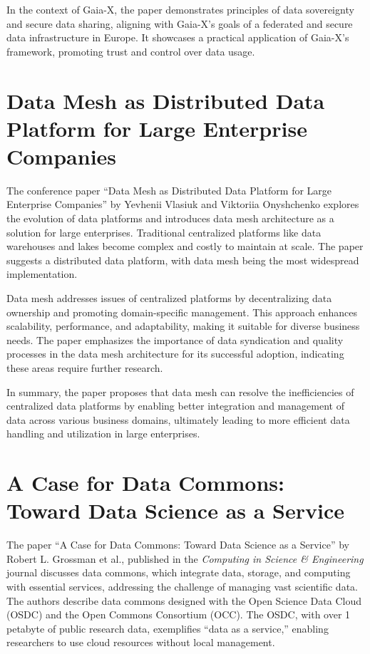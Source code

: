 In the context of Gaia-X, the paper demonstrates principles of data sovereignty and secure data sharing, aligning with Gaia-X's goals of a federated and secure data infrastructure in Europe.
It showcases a practical application of Gaia-X's framework, promoting trust and control over data usage.

\section{Data Mesh as Distributed Data Platform for Large Enterprise Companies}\label{sec:data-mesh-as-distributed-data-platform-for-large-enterprise-companies}

The conference paper ``Data Mesh as Distributed Data Platform for Large Enterprise Companies'' by Yevhenii Vlasiuk and Viktoriia Onyshchenko explores the evolution of data platforms and introduces data mesh architecture as a solution for large enterprises\cite{data_mesh}.
Traditional centralized platforms like data warehouses and lakes become complex and costly to maintain at scale.
The paper suggests a distributed data platform, with data mesh being the most widespread implementation.

Data mesh addresses issues of centralized platforms by decentralizing data ownership and promoting domain-specific management.
This approach enhances scalability, performance, and adaptability, making it suitable for diverse business needs.
The paper emphasizes the importance of data syndication and quality processes in the data mesh architecture for its successful adoption, indicating these areas require further research.

In summary, the paper proposes that data mesh can resolve the inefficiencies of centralized data platforms by enabling better integration and management of data across various business domains, ultimately leading to more efficient data handling and utilization in large enterprises.

\section{A Case for Data Commons: Toward Data Science as a Service}\label{sec:a-case-for-data-commons:-toward-data-science-as-a-service}

The paper ``A Case for Data Commons: Toward Data Science as a Service'' by Robert L. Grossman et al., published in the \textit{Computing in Science \& Engineering} journal discusses data commons, which integrate data, storage, and computing with essential services, addressing the challenge of managing vast scientific data\cite{towards_ds_as_a_service}.
The authors describe data commons designed with the Open Science Data Cloud (OSDC) and the Open Commons Consortium (OCC). The OSDC, with over 1 petabyte of public research data, exemplifies ``data as a service,'' enabling researchers to use cloud resources without local management.

